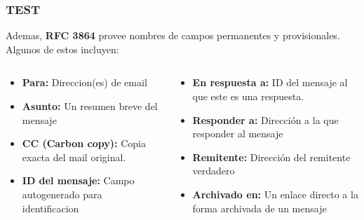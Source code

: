 \documentclass{beamer}
\begin{document}
\begin{frame}
\frametitle{TEST}
\tableofcontents
Ademas, \textbf{RFC 3864} provee nombres de campos permanentes y provisionales. Algunos de estos incluyen:
\begin{columns}

\begin{column}{0.5\textwidth}
\begin{itemize}
\item \small \textbf{Para:} Direccion(es) de email
\item \small \textbf{Asunto:} Un resumen breve del mensaje
\item \small \textbf{CC (Carbon copy):} Copia exacta del mail original.
\item \small \textbf{ID del mensaje:} Campo autogenerado para identificacion
\end{itemize}
\end{column}

\begin{column}{0.5\textwidth}
\begin{itemize}
\item \small \textbf{En respuesta a:} ID del mensaje al que este es una respuesta.
\item \small \textbf{Responder a:} Dirección a la que responder al mensaje
\item \small \textbf{Remitente:} Dirección del remitente verdadero
\item \small \textbf{Archivado en:} Un enlace directo a la forma archivada de un mensaje 
\end{itemize}
\end{column}

\end{columns}

\end{frame}
\end{document}
